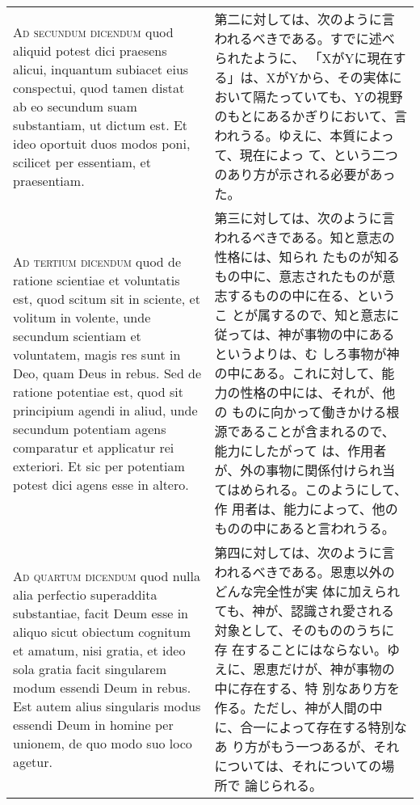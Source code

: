 \documentclass[10pt]{jsarticle} %
\begin{document}
\begin{longtable}{p{21em}p{21em}}
{\scshape Ad secundum dicendum} quod aliquid potest dici praesens alicui,
 inquantum subiacet eius conspectui, quod tamen distat ab eo secundum
 suam substantiam, ut dictum est. Et ideo oportuit duos modos poni,
 scilicet per essentiam, et praesentiam.

&

第二に対しては、次のように言われるべきである。すでに述べられたように、
 「XがYに現在する」は、XがYから、その実体において隔たっていても、Yの視野
 のもとにあるかぎりにおいて、言われうる。ゆえに、本質によって、現在によっ
 て、という二つのあり方が示される必要があった。

\\


{\scshape Ad tertium dicendum} quod de ratione scientiae et voluntatis est,
 quod scitum sit in sciente, et volitum in volente, unde secundum
 scientiam et voluntatem, magis res sunt in Deo, quam Deus in rebus. Sed
 de ratione potentiae est, quod sit principium agendi in aliud, unde
 secundum potentiam agens comparatur et applicatur rei exteriori. Et sic
 per potentiam potest dici agens esse in altero.

&

第三に対しては、次のように言われるべきである。知と意志の性格には、知られ
 たものが知るもの中に、意志されたものが意志するものの中に在る、というこ
 とが属するので、知と意志に従っては、神が事物の中にあるというよりは、む
 しろ事物が神の中にある。これに対して、能力の性格の中には、それが、他の
 ものに向かって働きかける根源であることが含まれるので、能力にしたがって
 は、作用者が、外の事物に関係付けられ当てはめられる。このようにして、作
 用者は、能力によって、他のものの中にあると言われうる。

\\


{\scshape Ad quartum dicendum} quod nulla alia perfectio superaddita
 substantiae, facit Deum esse in aliquo sicut obiectum cognitum et
 amatum, nisi gratia, et ideo sola gratia facit singularem modum essendi
 Deum in rebus. Est autem alius singularis modus essendi Deum in homine
 per unionem, de quo modo suo loco agetur.

&

第四に対しては、次のように言われるべきである。恩恵以外のどんな完全性が実
 体に加えられても、神が、認識され愛される対象として、そのもののうちに存
 在することにはならない。ゆえに、恩恵だけが、神が事物の中に存在する、特
 別なあり方を作る。ただし、神が人間の中に、合一によって存在する特別なあ
 り方がもう一つあるが、それについては、それについての場所で 論じられる。

\end{longtable}
\newpage
{}
\end{document}
